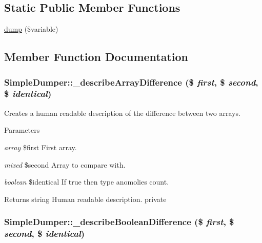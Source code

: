 \subsection*{Static Public Member Functions}
\begin{DoxyCompactItemize}
\item 
\hyperlink{class_simple_dumper_a7acdf399736c49015da241d4a4a2a55a}{dump} (\$variable)
\end{DoxyCompactItemize}


\subsection{Member Function Documentation}
\hypertarget{class_simple_dumper_afd7841060f7d5b0ef8307ec085bdc105}{
\subsubsection[{\_\-describeArrayDifference}]{\setlength{\rightskip}{0pt plus 5cm}SimpleDumper::\_\-describeArrayDifference (\$ {\em first}, \/  \$ {\em second}, \/  \$ {\em identical})}}
\label{class_simple_dumper_afd7841060f7d5b0ef8307ec085bdc105}
Creates a human readable description of the difference between two arrays. 
\begin{DoxyParams}{Parameters}
\item[{\em array}]\$first First array. \item[{\em mixed}]\$second Array to compare with. \item[{\em boolean}]\$identical If true then type anomolies count. \end{DoxyParams}
\begin{DoxyReturn}{Returns}
string Human readable description.  private 
\end{DoxyReturn}
\hypertarget{class_simple_dumper_a7985db05f6a6efc44fe11dda9af19e8b}{
\subsubsection[{\_\-describeBooleanDifference}]{\setlength{\rightskip}{0pt plus 5cm}SimpleDumper::\_\-describeBooleanDifference (\$ {\em first}, \/  \$ {\em second}, \/  \$ {\em identical})}}
